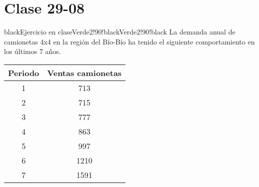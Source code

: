\documentclass{templateNote}
\begin{document}
\section{Clase 29-08}
\begin{CuadroPersonalizado}{black}{Ejercicio en clase}{Verde2!90!black}{Verde2!90!black}
  La demanda anual de camionetas 4x4 en la región del Bío-Bío ha tenido el siguiente comportamiento en los últimos 7 años.
  \begin{table}[H]
    \centering
    \begin{tabular}{|c|c|}
      \hline
      \textbf{Periodo} & \textbf{Ventas camionetas} \\
      \hline
      1 & 713 \\
      2 & 715 \\
      3 & 777 \\
      4 & 863 \\
      5 & 997 \\
      6 & 1210 \\
      7 & 1591 \\
      \hline
    \end{tabular}
  \end{table}


\end{CuadroPersonalizado}
\end{document}
